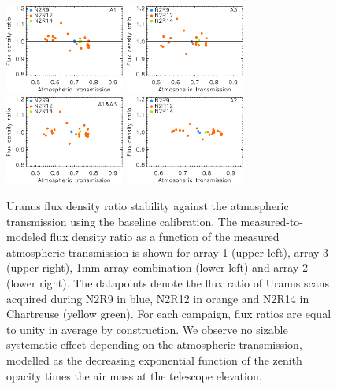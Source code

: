 \begin{figure}[ht!]
  \begin{center}
    \includegraphics[clip=true, trim={0, -0.3cm, -0.3cm, 0}, width=0.35\textwidth]{Figures/Calibration/plot_flux_density_ratio_obstau_uranus_corrected_skydip_narrow_a1.pdf}
    \includegraphics[clip=true, trim={0, -0.3cm, -0.3cm, 0}, width=0.35\textwidth]{Figures/Calibration/plot_flux_density_ratio_obstau_uranus_corrected_skydip_narrow_a3.pdf}
    \includegraphics[clip=true, trim={0, -0.3cm, -0.3cm, 0}, width=0.35\textwidth]{Figures/Calibration/plot_flux_density_ratio_obstau_uranus_corrected_skydip_narrow_1mm.pdf}
    \includegraphics[clip=true, trim={0, -0.3cm, -0.3cm, 0}, width=0.35\textwidth]{Figures/Calibration/plot_flux_density_ratio_obstau_uranus_corrected_skydip_narrow_a2.pdf}
    \caption[Uranus flux density stability against atmospheric
      transmission]{Uranus flux density ratio stability against the
      atmospheric transmission using the baseline calibration.
      The measured-to-modeled flux density
      ratio as a function of the measured atmospheric transmission is
      shown for array 1 (upper left), array 3 (upper right), 1mm array
      combination (lower left) and array 2 (lower right).
      The datapoints denote the flux ratio of Uranus scans acquired
      during N2R9 in blue, N2R12 in orange and N2R14 in Chartreuse
      (yellow green).
      For each campaign, flux ratios are equal to unity in average by
      construction. We observe no sizable systematic effect depending
      on the atmospheric transmission, modelled as the decreasing exponential
      function of the zenith opacity times the air mass at the
      telescope elevation.}
\label{fig:uranus_flux_obstau}
\end{center}
\end{figure}


